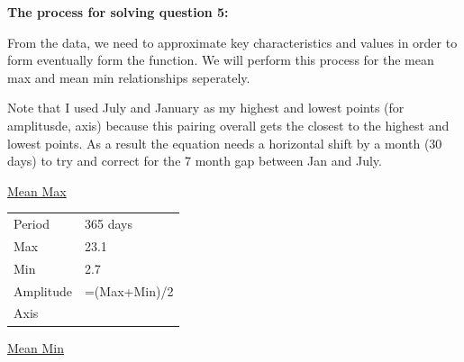 \documentclass[12pt]{book}
\begin{document}
\begin{enumerate}
\vspace{0.3cm}
\textbf{The process for solving question 5:}

\vspace{0.3cm}
From the data, we need to approximate key characteristics and values in order to form 
eventually form the function. We will perform this process for the mean max and mean 
min relationships seperately.

\vspace{0.3cm}
Note that I used July and January as my highest and lowest points (for amplitusde, axis) 
because this pairing overall gets the closest to the highest and lowest points. As a result 
the equation needs a horizontal shift by a month (30 days) to try and correct for the 7 month 
gap between Jan and July.

\vspace{0.3cm}
\underline{Mean Max}

\vspace{0.3cm}
\begin{tabular}{l|l}
    Period & 365 days \\
    Max & 23.1 \\
    Min & 2.7 \\
    Amplitude & =(Max+Min)/2\\
    Axis & \\

\end{tabular}

\underline{Mean Min}

\newpage


\end{enumerate}
\end{document}
